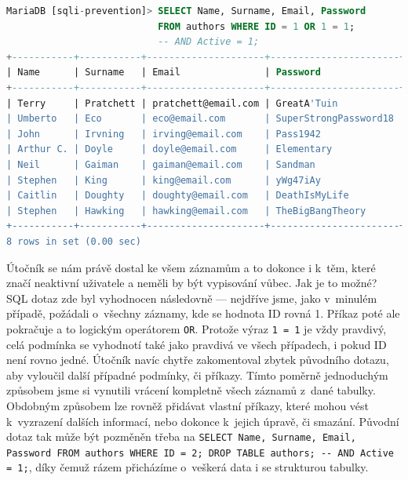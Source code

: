\begin{lstlisting}[language=sql]
MariaDB [sqli-prevention]> SELECT Name, Surname, Email, Password 
                           FROM authors WHERE ID = 1 OR 1 = 1; 
                           -- AND Active = 1;
+-----------+-----------+---------------------+-----------------------+
| Name      | Surname   | Email               | Password              |
+-----------+-----------+---------------------+-----------------------+
| Terry     | Pratchett | pratchett@email.com | GreatA'Tuin           |
| Umberto   | Eco       | eco@email.com       | SuperStrongPassword18 |
| John      | Irvning   | irving@email.com    | Pass1942              |
| Arthur C. | Doyle     | doyle@email.com     | Elementary            |
| Neil      | Gaiman    | gaiman@email.com    | Sandman               |
| Stephen   | King      | king@email.com      | yWg47iAy              |
| Caitlin   | Doughty   | doughty@email.com   | DeathIsMyLife         |
| Stephen   | Hawking   | hawking@email.com   | TheBigBangTheory      |
+-----------+-----------+---------------------+-----------------------+
8 rows in set (0.00 sec)
\end{lstlisting}

Útočník se nám právě dostal ke všem záznamům a to dokonce i k~těm, které značí neaktivní uživatele a neměli by být vypisování vůbec.
Jak je to možné? SQL dotaz zde byl vyhodnocen následovně --- nejdříve jsme, jako v~minulém případě, požádali o~všechny záznamy, kde
se hodnota ID rovná 1. Příkaz poté ale pokračuje a to logickým operátorem \texttt{OR}. Protože výraz \texttt{1 = 1} je vždy pravdivý,
celá podmínka se vyhodnotí také jako pravdivá ve všech případech, i pokud ID není rovno jedné. Útočník navíc chytře zakomentoval
zbytek původního dotazu, aby vyloučil další případné podmínky, či příkazy. Tímto poměrně jednoduchým způsobem jsme si vynutili
vrácení kompletně všech záznamů z~dané tabulky.\\

\Bat{} Obdobným způsobem lze rovněž přidávat vlastní příkazy, které mohou vést k~vyzrazení dalších informací, nebo dokonce k~jejich úpravě,
či smazání. Původní dotaz tak může být pozměněn třeba na 
\texttt{SELECT Name, Surname, Email, Password FROM authors WHERE ID = 2; DROP TABLE authors; -{}- AND Active = 1;},
díky čemuž rázem přicházíme o~veškerá data i se strukturou tabulky.

